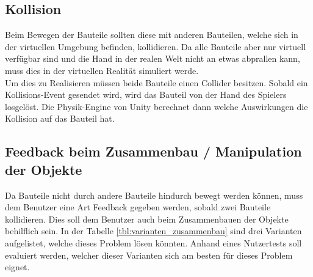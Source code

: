 \subsection{Kollision}
\label{ch:kollision}
Beim Bewegen der Bauteile sollten diese mit anderen Bauteilen, welche sich in der virtuellen Umgebung befinden, kollidieren. Da alle Bauteile aber nur virtuell verfügbar sind und die Hand in der realen Welt nicht an etwas abprallen kann, muss dies in der virtuellen Realität simuliert werde. \\
Um dies zu Realisieren müssen beide Bauteile einen Collider besitzen. Sobald ein Kollisions-Event gesendet wird, wird das Bauteil von der Hand des Spielers losgelöst. Die Physik-Engine von Unity berechnet dann welche Auswirkungen die Kollision auf das Bauteil hat.
	
\subsection{Feedback beim Zusammenbau / Manipulation der Objekte}
\label{ch:feedback_zusammenbau_konzepte}
Da Bauteile nicht durch andere Bauteile hindurch bewegt werden können, muss dem Benutzer eine Art Feedback gegeben werden, sobald zwei Bauteile kollidieren. Dies soll dem Benutzer auch beim Zusammenbauen der Objekte behilflich sein. In der Tabelle \ref{tbl:varianten_zusammenbau} sind drei Varianten aufgelistet, welche dieses Problem lösen könnten. Anhand eines Nutzertests soll evaluiert werden, welcher dieser Varianten sich am besten für dieses Problem eignet.
	
